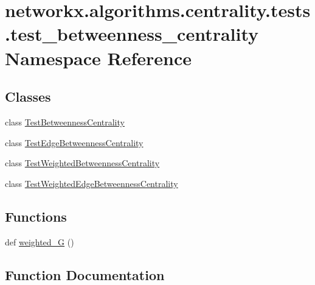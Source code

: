 \hypertarget{namespacenetworkx_1_1algorithms_1_1centrality_1_1tests_1_1test__betweenness__centrality}{}\section{networkx.\+algorithms.\+centrality.\+tests.\+test\+\_\+betweenness\+\_\+centrality Namespace Reference}
\label{namespacenetworkx_1_1algorithms_1_1centrality_1_1tests_1_1test__betweenness__centrality}
\subsection*{Classes}
\begin{DoxyCompactItemize}
\item 
class \hyperlink{classnetworkx_1_1algorithms_1_1centrality_1_1tests_1_1test__betweenness__centrality_1_1TestBetweennessCentrality}{Test\+Betweenness\+Centrality}
\item 
class \hyperlink{classnetworkx_1_1algorithms_1_1centrality_1_1tests_1_1test__betweenness__centrality_1_1TestEdgeBetweennessCentrality}{Test\+Edge\+Betweenness\+Centrality}
\item 
class \hyperlink{classnetworkx_1_1algorithms_1_1centrality_1_1tests_1_1test__betweenness__centrality_1_1TestWeightedBetweennessCentrality}{Test\+Weighted\+Betweenness\+Centrality}
\item 
class \hyperlink{classnetworkx_1_1algorithms_1_1centrality_1_1tests_1_1test__betweenness__centrality_1_1TestWeightedEdgeBetweennessCentrality}{Test\+Weighted\+Edge\+Betweenness\+Centrality}
\end{DoxyCompactItemize}
\subsection*{Functions}
\begin{DoxyCompactItemize}
\item 
def \hyperlink{namespacenetworkx_1_1algorithms_1_1centrality_1_1tests_1_1test__betweenness__centrality_afb75b6bd9d4f3b739036227504eaa192}{weighted\+\_\+G} ()
\end{DoxyCompactItemize}


\subsection{Function Documentation}
\mbox{\label{namespacenetworkx_1_1algorithms_1_1centrality_1_1tests_1_1test__betweenness__centrality_afb75b6bd9d4f3b739036227504eaa192}} 
